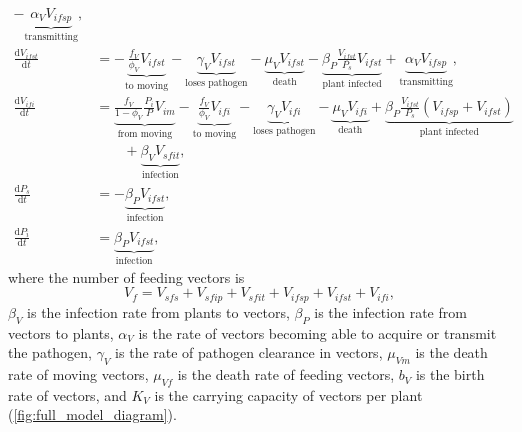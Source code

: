 \documentclass{article}
\newcommand{\md}{\mathrm{d}}
\begin{document}
\begin{equation}
\begin{split}
    - \underbrace{\alpha_V V_{ifsp}}_{\text{transmitting}},
    \\
    \frac{\md V_{ifst}}{\md t}
    &=
    - \underbrace{\frac{f_V}{\phi_V} V_{ifst}}_{\text{to moving}}
    - \underbrace{\gamma_V V_{ifst}}_{\text{loses pathogen}}
    - \underbrace{\mu_V V_{ifst}}_{\text{death}}
    - \underbrace{\beta_P \frac{V_{ifst}}{P_s} V_{ifst}}_{\text{plant infected}}
    + \underbrace{\alpha_V V_{ifsp}}_{\text{transmitting}},
    \\
    \frac{\md V_{ifi}}{\md t}
    &=
    \underbrace{\frac{f_V}{1 - \phi_V} \frac{P_i}{P} V_{im}}_{\text{from moving}}
    - \underbrace{\frac{f_V}{\phi_V} V_{ifi}}_{\text{to moving}}
    - \underbrace{\gamma_V V_{ifi}}_{\text{loses pathogen}}
    - \underbrace{\mu_V V_{ifi}}_{\text{death}}
    + \underbrace{\beta_P \frac{V_{ifst}}{P_s} (V_{ifsp} + V_{ifst})}_{\text{plant infected}}
    \\ & \quad\quad {}
    + \underbrace{\beta_V V_{sfit}}_{\text{infection}},
    \\
    \frac{\md P_s}{\md t}
    &=
    - \underbrace{\beta_P V_{ifst}}_{\text{infection}},
    \\
    \frac{\md P_i}{\md t}
    &=
    \underbrace{\beta_P V_{ifst}}_{\text{infection}},
  \end{split}
\end{equation}
where the number of feeding vectors is
\begin{equation}
  V_f = V_{sfs} + V_{sfip} + V_{sfit} + V_{ifsp} + V_{ifst} + V_{ifi},
\end{equation}
$\beta_V$ is the infection rate from plants to vectors, $\beta_P$ is
the infection rate from vectors to plants, $\alpha_V$ is the rate of
vectors becoming able to acquire or transmit the pathogen, $\gamma_V$
is the rate of pathogen clearance in vectors, $\mu_{Vm}$ is the death
rate of moving vectors, $\mu_{Vf}$ is the death rate of feeding
vectors, $b_V$ is the birth rate of vectors, and $K_V$ is the carrying
capacity of vectors per plant (\autoref{fig:full_model_diagram}).
\end{document}
